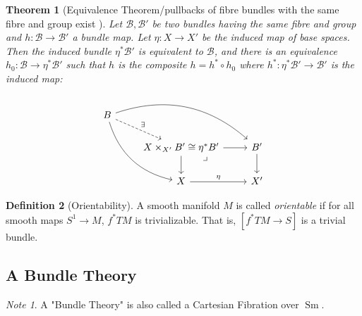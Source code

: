 \documentclass[reqno]{amsart}
\newtheorem{theorem}{Theorem}[section]
\theoremstyle{definition}
\newtheorem{definition}[theorem]{Definition}
\theoremstyle{remark}
\newtheorem*{note}{Note}
\DeclareMathOperator{\Sm}{Sm}
\begin{document}
    \begin{theorem}[Equivalence
        Theorem/pullbacks of fibre bundles with the same
        fibre and group exist
        ]\label{Equivalence-Theorem-Induced-Bundles}
        Let $\mathcal{B},\mathcal{B}'$ be two bundles having
        the same fibre and group and
        $h \colon \mathcal{B} \to \mathcal{B}'$ a bundle
        map. Let
        $\eta \colon X \to X'$  be the induced map of
        base spaces. Then the induced
        bundle $\eta^{*}\mathcal{B}'$ is equivalent to
        $\mathcal{B}$, and there
        is an equivalence
        $h_0 \colon \mathcal{B} \to \eta^{*}\mathcal{B}'$ such
        that $h$ is the composite
        $h = h^{*} \circ h_0$ where
        $h^{*} \colon \eta^{*}\mathcal{B}' \to 
        \mathcal{B}'$ is the induced map:

        \begin{equation*}
        \begin{tikzcd}
            B \ar[dr, "\exists", dashed]
            \ar[drr, bend left] \ar[ddr, bend right] & & \\
              & X \times_{X'}B'
            \cong \eta^{*}B' \ar[r] \ar[d]
            \ar[dr, phantom, "\lrcorner", very near start]
              & B' \ar[d] \\
              & X \ar[r, "\eta"] & X'
        \end{tikzcd}
        \end{equation*}
    \end{theorem}

    \begin{definition}[Orientability]
        A smooth manifold
        $M$ is called \textit{orientable} if
        for all smooth maps
        $S^{1} \to M$,
        $f^{*} TM$ is trivializable.
        That is,
        $\left[ f^{*}TM \to S \right] $ is a
        trivial bundle.
    \end{definition}



    \subsection{A Bundle Theory}

    \begin{note}
        A "Bundle Theory" is also called a 
        Cartesian Fibration over
        $\Sm$.
    \end{note}
\end{document}
